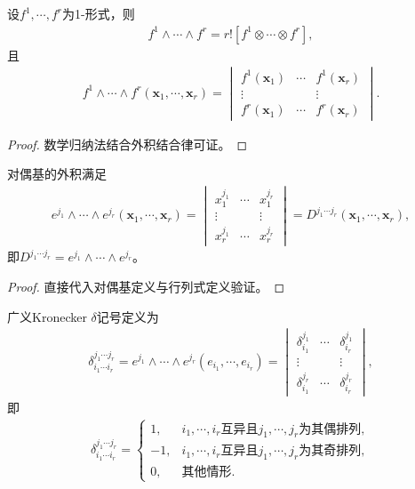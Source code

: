 \documentclass[../../main.tex]{subfiles}%
\begin{document}
\begin{proposition}
设$f^1,\cdots,f^r$为1-形式，则
\begin{align}
f^1\wedge\cdots\wedge f^r=r![f^1\otimes\cdots\otimes f^r],
\label{eq:r_wedge_1form}
\end{align}
且
\begin{align*}
f^1\wedge\cdots\wedge f^r(\boldsymbol{x}_1,\cdots,\boldsymbol{x}_r)=
\begin{vmatrix}
f^1(\boldsymbol{x}_1) & \cdots & f^1(\boldsymbol{x}_r)\\
\vdots & & \vdots\\
f^r(\boldsymbol{x}_1) & \cdots & f^r(\boldsymbol{x}_r)
\end{vmatrix}.
\end{align*}
\end{proposition}
\begin{proof}
数学归纳法结合外积结合律可证。
\end{proof}

\begin{proposition}
对偶基的外积满足
\begin{align}
e^{j_1}\wedge\cdots\wedge e^{j_r}(\boldsymbol{x}_1,\cdots,\boldsymbol{x}_r)=
\begin{vmatrix}
x_1^{j_1} & \cdots & x_1^{j_r}\\
\vdots & & \vdots\\
x_r^{j_1} & \cdots & x_r^{j_r}
\end{vmatrix}=D^{j_1\cdots j_r}(\boldsymbol{x}_1,\cdots,\boldsymbol{x}_r),
\label{eq:basis_wedge_det}
\end{align}
即$D^{j_1\cdots j_r}=e^{j_1}\wedge\cdots\wedge e^{j_r}$。
\end{proposition}
\begin{proof}
直接代入对偶基定义与行列式定义验证。
\end{proof}

\begin{definition}
广义Kronecker $\delta$记号定义为
\begin{align}
\delta_{i_1\cdots i_r}^{j_1\cdots j_r}=e^{j_1}\wedge\cdots\wedge e^{j_r}(e_{i_1},\cdots,e_{i_r})=
\begin{vmatrix}
\delta_{i_1}^{j_1} & \cdots & \delta_{i_r}^{j_1}\\
\vdots & & \vdots\\
\delta_{i_1}^{j_r} & \cdots & \delta_{i_r}^{j_r}
\end{vmatrix},
\label{eq:general_kronecker}
\end{align}
即
\begin{align*}
\delta_{i_1\cdots i_r}^{j_1\cdots j_r}=
\begin{cases}
1, & i_1,\cdots,i_r\text{互异且}j_1,\cdots,j_r\text{为其偶排列},\\
-1, & i_1,\cdots,i_r\text{互异且}j_1,\cdots,j_r\text{为其奇排列},\\
0, & \text{其他情形}.
\end{cases}
\end{align*}
\end{definition}
\end{document}
